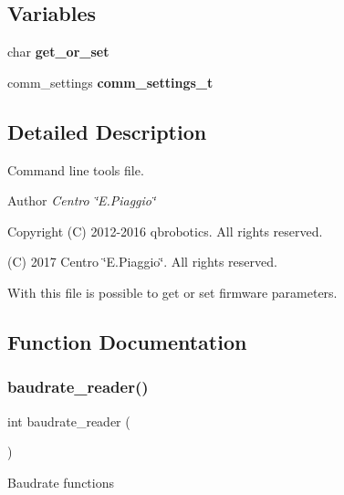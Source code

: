 \subsection*{Variables}
\begin{DoxyCompactItemize}
\item 
\mbox{\label{qbparam_8c_a3c28322a1b5922f8c61d7cb3723b56b1}} 
char {\bfseries get\+\_\+or\+\_\+set}
\item 
\mbox{\label{qbparam_8c_a92153f4b70cd8ba4e9b502ccff8d28bf}} 
comm\+\_\+settings {\bfseries comm\+\_\+settings\+\_\+t}
\end{DoxyCompactItemize}


\subsection{Detailed Description}
Command line tools file. 

\begin{DoxyAuthor}{Author}
{\itshape Centro \char`\"{}\+E.\+Piaggio\char`\"{}} 
\end{DoxyAuthor}
\begin{DoxyCopyright}{Copyright}
(C) 2012-\/2016 qbrobotics. All rights reserved. 

(C) 2017 Centro \char`\"{}\+E.\+Piaggio\char`\"{}. All rights reserved.
\end{DoxyCopyright}
With this file is possible to get or set firmware parameters. 

\subsection{Function Documentation}
\mbox{\label{qbparam_8c_a872d84bb02f7d8f4617246f0c6d37c43}} 
\subsubsection{baudrate\+\_\+reader()}
{\footnotesize\ttfamily int baudrate\+\_\+reader (\begin{DoxyParamCaption}{ }\end{DoxyParamCaption})}

Baudrate functions 